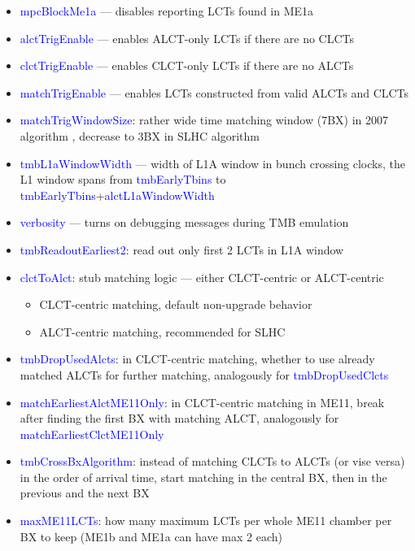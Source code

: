\begin{itemize}
	\item \textcolor{blue}{mpcBlockMe1a} --- disables reporting LCTs found in ME1a
	\item \textcolor{blue}{alctTrigEnable} --- enables ALCT-only LCTs if there are no CLCTs
	\item \textcolor{blue}{clctTrigEnable} --- enables CLCT-only LCTs if there are no ALCTs
	\item \textcolor{blue}{matchTrigEnable} --- enables LCTs constructed from valid ALCTs and CLCTs
	\item \textcolor{blue}{matchTrigWindowSize}: rather wide time matching window (7BX) in 2007 algorithm , decrease to 3BX in SLHC algorithm
        \item \textcolor{blue}{tmbL1aWindowWidth} --- width of L1A window in bunch crossing clocks, the L1 window spans 
        from \textcolor{blue}{tmbEarlyTbins} to \textcolor{blue}{tmbEarlyTbins}+\textcolor{blue}{alctL1aWindowWidth}
	\item \textcolor{blue}{verbosity} --- turns on debugging messages during TMB emulation
	\item \textcolor{blue}{tmbReadoutEarliest2}: read out only first 2 LCTs in L1A window
	\item \textcolor{blue}{clctToAlct}: stub matching logic --- either CLCT-centric or ALCT-centric
	\begin{itemize}
		\item CLCT-centric matching, default non-upgrade behavior
		\item ALCT-centric matching, recommended for SLHC
	\end{itemize}
	\item \textcolor{blue}{tmbDropUsedAlcts}: in CLCT-centric matching, whether to use already matched ALCTs for further matching, analogously for \textcolor{blue}{tmbDropUsedClcts}
	\item \textcolor{blue}{matchEarliestAlctME11Only}: in CLCT-centric matching in ME11, break after finding the first BX with matching ALCT, analogously for \textcolor{blue}{matchEarliestClctME11Only}
	\item \textcolor{blue}{tmbCrossBxAlgorithm}: instead of matching CLCTs to ALCTs (or vise versa) in the order of arrival time, start matching in the central BX, then in the previous and the next BX
	\item \textcolor{blue}{maxME11LCTs}: how many maximum LCTs per whole ME11 chamber per BX to keep (ME1b and ME1a can have max 2 each)
\end{itemize}

